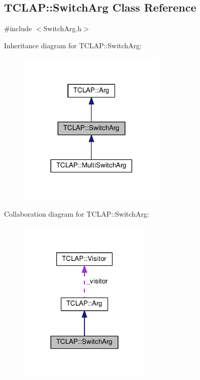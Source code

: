 \hypertarget{classTCLAP_1_1SwitchArg}{}\subsection{T\+C\+L\+AP\+:\+:Switch\+Arg Class Reference}
\label{classTCLAP_1_1SwitchArg}


{\ttfamily \#include $<$Switch\+Arg.\+h$>$}



Inheritance diagram for T\+C\+L\+AP\+:\+:Switch\+Arg\+:
\nopagebreak
\begin{figure}[H]
\begin{center}
\leavevmode
\includegraphics[width=201pt]{classTCLAP_1_1SwitchArg__inherit__graph}
\end{center}
\end{figure}


Collaboration diagram for T\+C\+L\+AP\+:\+:Switch\+Arg\+:
\nopagebreak
\begin{figure}[H]
\begin{center}
\leavevmode
\includegraphics[width=180pt]{classTCLAP_1_1SwitchArg__coll__graph}
\end{center}
\end{figure}
